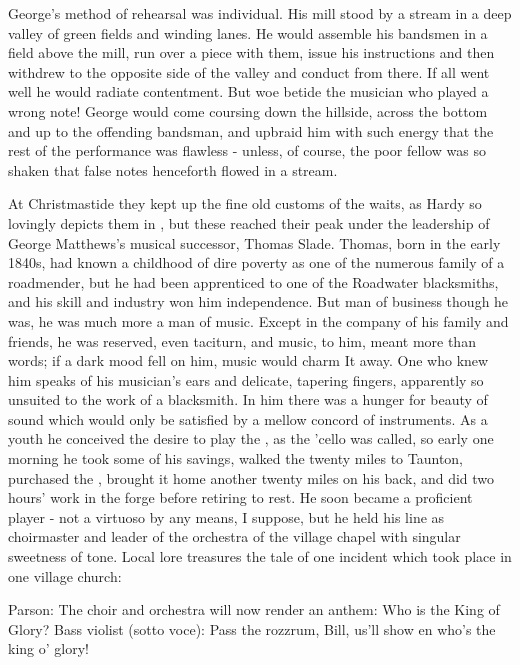 George's method of rehearsal was individual. His mill stood by a stream in a deep valley of green fields and winding lanes. He would assemble his bandsmen in a field above the mill, run over a piece with them, issue his instructions and then withdrew to the opposite side of the valley and conduct from there. If all went well he would radiate contentment. But woe betide the musician who played a wrong note! George would come coursing down the hillside, across the bottom and up to the offending bandsman, and upbraid him with such energy that the rest of the performance was flawless - unless, of course, the poor fellow was so shaken that false notes henceforth flowed in a stream.

At Christmastide they kept up the fine old customs of the waits, as Hardy so lovingly depicts them in , but these reached their peak under the leadership of George Matthews's musical successor, Thomas Slade. Thomas, born in the early 1840s, had known a childhood of dire poverty as one of the numerous family of a roadmender, but he had been apprenticed to one of the Roadwater blacksmiths, and his skill and industry won him independence. But man of business though he was, he was much more a man of music. Except in the company of his family and friends, he was reserved, even taciturn, and music, to him, meant more than words; if a dark mood fell on him, music would charm It away. One who knew him speaks of his musician's ears and delicate, tapering fingers, apparently so unsuited to the work of a blacksmith. In him there was a hunger for beauty of sound which would only be satisfied by a mellow concord of instruments. As a youth he conceived the desire to play the , as the 'cello was called, so early one morning he took some of his savings, walked the twenty miles to Taunton, purchased the , brought it home another twenty miles on his back, and did two hours' work in the forge before retiring to rest. He soon became a proficient player - not a virtuoso by any means, I suppose, but he held his line as choirmaster and leader of the orchestra of the village chapel with singular sweetness of tone. Local lore treasures the tale of one incident which took place in one village church:

Parson: The choir and orchestra will now render an anthem: Who is the King of Glory?
Bass violist (sotto voce): Pass the rozzrum, Bill, us'll show en who’s the king o’ glory!

